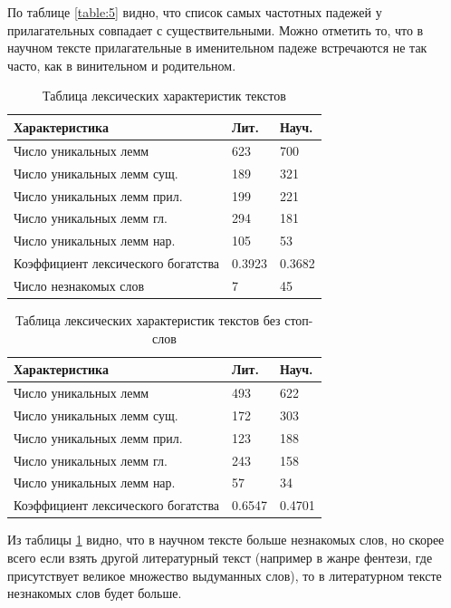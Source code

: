 \documentclass[12pt]{article}
\begin{document}
По таблице \ref{table:5} видно, что список самых частотных падежей у прилагательных совпадает с существительными. Можно отметить то, что в научном тексте прилагательные в именительном падеже встречаются не так часто, как в винительном и родительном.

\begin{table}[h!]
\centering
\begin{tabular}{ |p{7cm}||p{2cm}|p{2cm}| }
 \hline
 Характеристика& Лит. &Науч. \\
 \hline
 Число уникальных лемм & 623 & 700 \\
 Число уникальных лемм сущ. & 189 & 321 \\
 Число уникальных лемм прил. & 199 & 221 \\
 Число уникальных лемм гл. & 294 & 181 \\
 Число уникальных лемм нар. & 105 & 53 \\
 Коэффициент лексического богатства & 0.3923 & 0.3682 \\
 \hline
 Число незнакомых слов & 7 & 45 \\
 \hline
\end{tabular}
\caption{Таблица лексических характеристик текстов}
\label{table:6}
\end{table}

\begin{table}[h!]
\centering
\begin{tabular}{ |p{7cm}||p{2cm}|p{2cm}| }
 \hline
 Характеристика& Лит. &Науч. \\
 \hline
 Число уникальных лемм & 493 & 622 \\
 Число уникальных лемм сущ. & 172 & 303 \\
 Число уникальных лемм прил. & 123 & 188 \\
 Число уникальных лемм гл. & 243 & 158 \\
 Число уникальных лемм нар. & 57 & 34 \\
 Коэффициент лексического богатства & 0.6547 & 0.4701 \\
 \hline
\end{tabular}
\caption{Таблица лексических характеристик текстов без стоп-слов}
\label{table:7}
\end{table}

Из таблицы \ref{table:6} видно, что в научном тексте больше незнакомых слов, но скорее всего если взять другой литературный текст (например в жанре фентези, где присутствует великое множество выдуманных слов), то в литературном тексте незнакомых слов будет больше.
\end{document}
